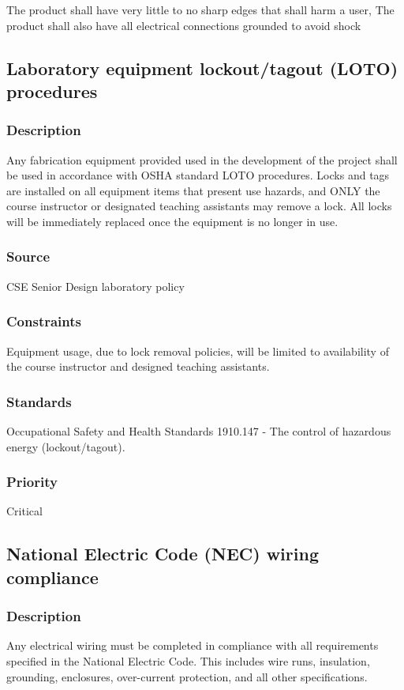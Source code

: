 The product shall have very little to no sharp edges that shall harm a user, The product shall also have all electrical connections grounded to avoid shock

\subsection{Laboratory equipment lockout/tagout (LOTO) procedures}
\subsubsection{Description}
Any fabrication equipment provided used in the development of the project shall be used in accordance with OSHA standard LOTO procedures. Locks and tags are installed on all equipment items that present use hazards, and ONLY the course instructor or designated teaching assistants may remove a lock. All locks will be immediately replaced once the equipment is no longer in use.
\subsubsection{Source}
CSE Senior Design laboratory policy
\subsubsection{Constraints}
Equipment usage, due to lock removal policies, will be limited to availability of the course instructor and designed teaching assistants.
\subsubsection{Standards}
Occupational Safety and Health Standards 1910.147 - The control of hazardous energy (lockout/tagout).
\subsubsection{Priority}
Critical

\subsection{National Electric Code (NEC) wiring compliance}
\subsubsection{Description}
Any electrical wiring must be completed in compliance with all requirements specified in the National Electric Code. This includes wire runs, insulation, grounding, enclosures, over-current protection, and all other specifications.
